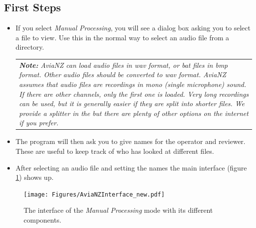 \documentclass{scrartcl}
\begin{document}
\subsection{First Steps}
\begin{itemize}
	\item If you select \textit{Manual Processing}, you will see a dialog box asking you to select a file to view. Use this in the normal way to select an audio file from a directory.
	\begin{table}[h!]
		\centering
		\begin{tabular}{p{}}
	\textit{\textbf{Note:} AviaNZ can load audio files in wav format, or bat files in bmp format. Other audio files should be converted to wav format.
	AviaNZ assumes that audio files are recordings in mono (single microphone) sound. If there are other channels, only the first one is loaded.
	Very long recordings can be used, but it is generally easier if they are split into shorter files. We provide a splitter in the \nameref{sec:utilities} but there are plenty of other options on the internet if you prefer.}\\
		\end{tabular}
	\end{table}
	\item The program will then ask you to give names for the operator and reviewer. These are useful to keep track of who has looked at different files.
	\item After selecting an audio file and setting the names the main interface (figure \ref{fig:Interface}) shows up.
\end{itemize}



\begin{figure}[htpb]
	\centering
	\texttt{[image: Figures/AviaNZInterface\_new.pdf]}
\caption{The interface of the \textit{Manual Processing} mode with its different components.}
	\label{fig:Interface}
\end{figure}
\end{document}
